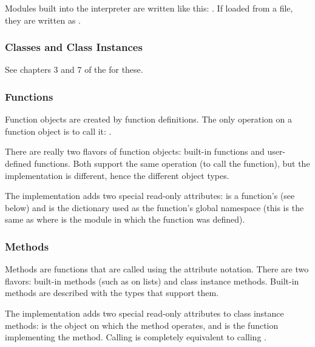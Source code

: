 Modules built into the interpreter are written like this:
.  If loaded from a file, they are
written as .


\subsubsection{Classes and Class Instances \label{typesobjects}}

See chapters 3 and 7 of the  for these.


\subsubsection{Functions \label{typesfunctions}}

Function objects are created by function definitions.  The only
operation on a function object is to call it:
.

There are really two flavors of function objects: built-in functions
and user-defined functions.  Both support the same operation (to call
the function), but the implementation is different, hence the
different object types.

The implementation adds two special read-only attributes:
 is a function's  (see below) and  is
the dictionary used as the function's global namespace (this is the
same as  where  is the module in which
the function  was defined).


\subsubsection{Methods \label{typesmethods}}

Methods are functions that are called using the attribute notation.
There are two flavors: built-in methods (such as  on
lists) and class instance methods.  Built-in methods are described
with the types that support them.

The implementation adds two special read-only attributes to class
instance methods:  is the object on which the
method operates, and  is the function
implementing the method.  Calling  is completely equivalent to
calling .

